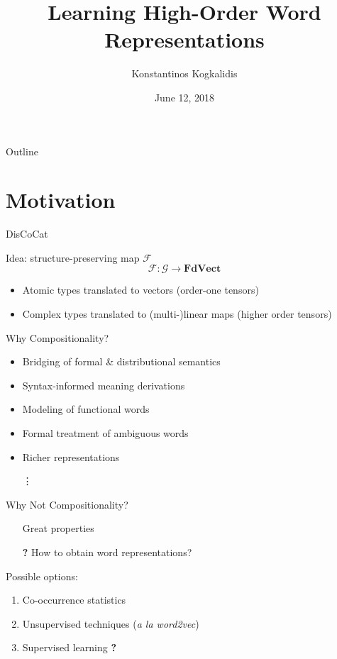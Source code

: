 \documentclass{beamer}
\title{Learning High-Order Word Representations}
\date{June 12, 2018}
\author{Konstantinos Kogkalidis}
\institute{LoLa Fan Club}
\newcommand{\xmark}{\ding{55}}
\begin{document}
  \maketitle
  
  
\begin{frame}{Outline}
\tableofcontents
\end{frame} 
 
\section{Motivation}
\begin{frame}{DisCoCat}

	Idea: structure-preserving map $\mathcal{F}$
	\[
	\mathcal{F}: \mathcal{G} \to \pmb{FdVect} 
	\]
	
	\begin{itemize}	
	\item Atomic types translated to vectors (order-one tensors)
	\item Complex types translated to (multi-)linear maps (higher order tensors)
	\end{itemize}
\end{frame}
  
\begin{frame}{Why Compositionality?}
	\begin{itemize}
	\item Bridging of formal \& distributional semantics
	\item Syntax-informed meaning derivations
	\item Modeling of functional words
	\item Formal treatment of ambiguous words
	\item Richer representations
	\item[] \quad \vdots
	\end{itemize}
\end{frame}

\begin{frame}{Why Not Compositionality?}
	\begin{itemize}
	\item[\textcolor{Yes}{\checkmark}] Great properties
	\item[\textcolor{Maybe}{\textbf{?}}] How to obtain word representations?
	\end{itemize}
	
	
	Possible options:
	\begin{enumerate}
	\pause
	\item Co-occurrence statistics 
	\pause \textcolor{No}{\xmark}
	\item Unsupervised techniques (\textit{a la word2vec})
	\pause \textcolor{No}{\xmark}
	\item Supervised learning
	\pause \textcolor{Maybe}{\textbf{?}}
	\end{enumerate}
\end{frame}
\end{document}
